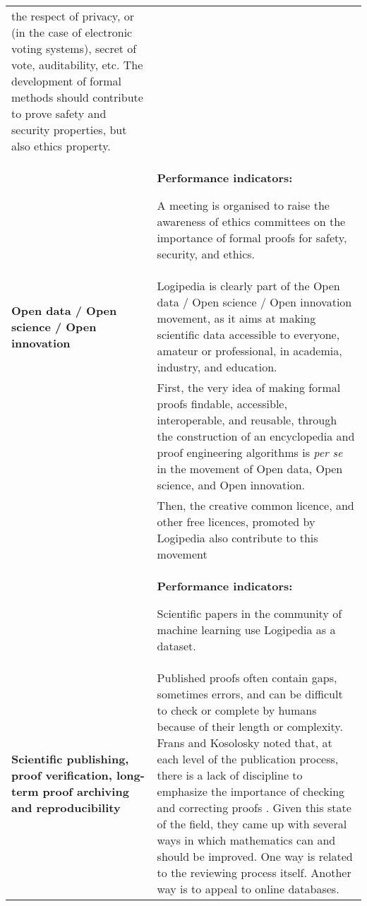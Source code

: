 \begin{longtable}{|p{}|p{}|}
the respect of privacy, or (in the case of electronic voting systems), 
secret of vote, auditability, etc.
The development of formal methods should contribute to prove 
safety and security properties, but also ethics property.
\\
&
\colorbox{color2}{\bf Performance indicators:}
\begin{compactitem}
\item A meeting is organised to raise the awareness of ethics committees
  on the importance of formal proofs for safety, security, and ethics.
\end{compactitem}
\\
\hline
{\bf Open data / Open science / Open innovation}
&
Logipedia is clearly part of the Open data / Open science / Open
innovation movement, as it aims at making scientific data accessible
to everyone, amateur or professional, in academia, industry, and
education.\\
&
\hspace{0.4cm}
First, the very idea of making formal proofs findable, accessible,
interoperable, and reusable, through the construction of an
encyclopedia and proof engineering algorithms is {\em per se} in the
movement of Open data, Open science, and Open innovation.\\
&
\hspace{0.4cm}
Then, the creative common licence, and other free licences, promoted by 
Logipedia also contribute to this movement\\
&
\colorbox{color2}{\bf Performance indicators:}
\begin{compactitem}
\item Scientific papers in the community of machine learning use 
  Logipedia as a dataset.
\end{compactitem}
\\
\hline
{\bf Scientific publishing, proof verification, long-term proof archiving and reproducibility}
&
Published proofs often contain gaps, sometimes errors, and can be difficult
to check or complete by humans because of their length or
complexity. Frans and Kosolosky noted that, at each level of the
publication process, there is a lack of discipline to emphasize the
importance of checking and correcting proofs
\cite{frans14theoria}. Given this state of the field, they came up
with several ways in which mathematics can and should be improved.
One way is related to the reviewing process itself. Another
way is to appeal to online databases.


\end{longtable}
